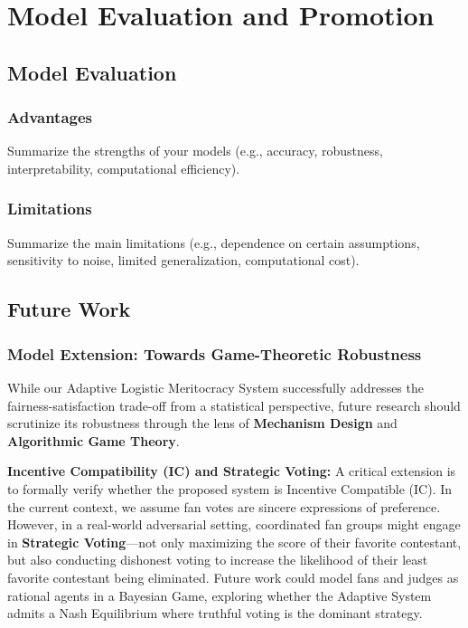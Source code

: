 \section{Model Evaluation and Promotion}

\subsection{Model Evaluation}


\subsubsection{Advantages}

Summarize the strengths of your models (e.g., accuracy, robustness, interpretability, computational efficiency).

\subsubsection{Limitations}

Summarize the main limitations (e.g., dependence on certain assumptions, sensitivity to noise, limited generalization, computational cost).

\subsection{Future Work}

\subsubsection{Model Extension: Towards Game-Theoretic Robustness}

While our Adaptive Logistic Meritocracy System successfully addresses the fairness-satisfaction trade-off from a statistical perspective, future research should scrutinize its robustness through the lens of \textbf{Mechanism Design} and \textbf{Algorithmic Game Theory}.

\textbf{Incentive Compatibility (IC) and Strategic Voting:}
A critical extension is to formally verify whether the proposed system is Incentive Compatible (IC). In the current context, we assume fan votes are sincere expressions of preference. However, in a real-world adversarial setting, coordinated fan groups might engage in \textbf{Strategic Voting}—not only maximizing the score of their favorite contestant, but also conducting dishonest voting to increase the likelihood of their least favorite contestant being eliminated. Future work could model fans and judges as rational agents in a Bayesian Game, exploring whether the Adaptive System admits a Nash Equilibrium where truthful voting is the dominant strategy.

